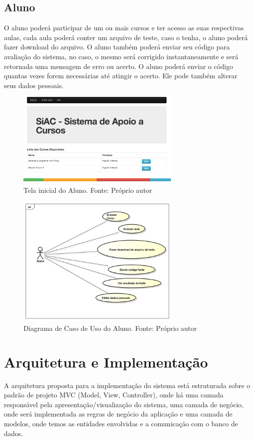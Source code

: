 \documentclass[pnumabnt,normaltoc,espacoumemeio,capchap]{abnt}
\begin{document}
\subsection{Aluno}
\par O aluno poderá participar de um ou mais cursos e ter acesso as suas respectivas aulas, cada aula poderá conter um arquivo de teste, caso o tenha, o aluno poderá fazer download do arquivo. O aluno também poderá enviar seu código para avaliação do sistema, no caso, o mesmo será corrigido instantaneamente e será retornada uma mensagem de erro ou acerto. O aluno poderá enviar o código quantas vezes forem necessárias até atingir o acerto. Ele pode também alterar seus dados pessoais.
\begin{figure}[htbp]
	\centering
	\caption{Tela inicial do Aluno\label{fig:tela-alu}. Fonte: Próprio autor}
	\includegraphics[width=8cm,scale=1]{images/tela-alu.png}
\end{figure}
\begin{figure}[htbp]
	\centering
	\caption{Diagrama de Caso de Uso do Aluno\label{fig:dia-alu}. Fonte: Próprio autor}
	\includegraphics[width=8cm,scale=1]{images/dia-alu.png}
\end{figure}
 
\section{Arquitetura e Implementação}
\par A arquitetura proposta para a implementação do sistema está estruturada sobre o padrão de projeto MVC (Model, View, Controller), onde há uma camada responsável pela apresentação/visualização do sistema, uma camada de negócio, onde será implementada as regras de negócio da aplicação e uma camada de modelos, onde temos as entidades envolvidas e a comunicação com o banco de dados. 
\end{document}

